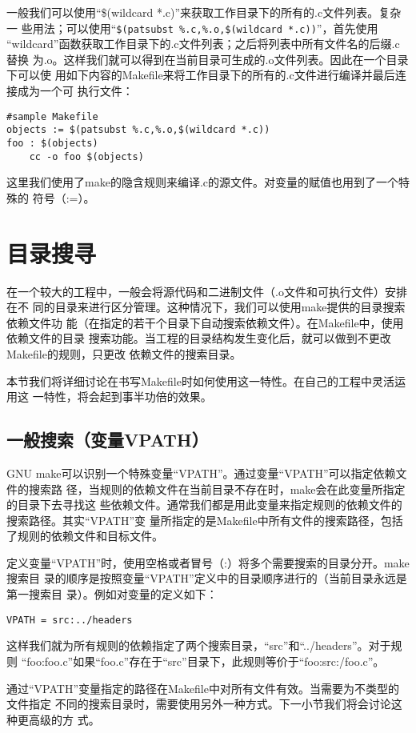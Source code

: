 一般我们可以使用“\$(wildcard *.c)”来获取工作目录下的所有的.c文件列表。复杂一
些用法；可以使用“\verb"$(patsubst %.c,%.o,$(wildcard *.c))"”，首先使用
“wildcard”函数获取工作目录下的.c文件列表；之后将列表中所有文件名的后缀.c替换
为.o。这样我们就可以得到在当前目录可生成的.o文件列表。因此在一个目录下可以使
用如下内容的Makefile来将工作目录下的所有的.c文件进行编译并最后连接成为一个可
执行文件：
\begin{Verbatim}[]
#sample Makefile
objects := $(patsubst %.c,%.o,$(wildcard *.c))
foo : $(objects)
    cc -o foo $(objects)
\end{Verbatim}

这里我们使用了make的隐含规则来编译.c的源文件。对变量的赋值也用到了一个特殊的
符号（:=）。


\section{目录搜寻}
在一个较大的工程中，一般会将源代码和二进制文件（.o文件和可执行文件）安排在不
同的目录来进行区分管理。这种情况下，我们可以使用make提供的目录搜索依赖文件功
能（在指定的若干个目录下自动搜索依赖文件）。在Makefile中，使用依赖文件的目录
搜索功能。当工程的目录结构发生变化后，就可以做到不更改Makefile的规则，只更改
依赖文件的搜索目录。

本节我们将详细讨论在书写Makefile时如何使用这一特性。在自己的工程中灵活运用这
一特性，将会起到事半功倍的效果。

\subsection{一般搜索（变量VPATH）}
GNU make可以识别一个特殊变量“VPATH”。通过变量“VPATH”可以指定依赖文件的搜索路
径，当规则的依赖文件在当前目录不存在时，make会在此变量所指定的目录下去寻找这
些依赖文件。通常我们都是用此变量来指定规则的依赖文件的搜索路径。其实“VPATH”变
量所指定的是Makefile中所有文件的搜索路径，包括了规则的依赖文件和目标文件。

定义变量“VPATH”时，使用空格或者冒号（:）将多个需要搜索的目录分开。make搜索目
录的顺序是按照变量“VPATH”定义中的目录顺序进行的（当前目录永远是第一搜索目
录）。例如对变量的定义如下：
\begin{Verbatim}[]
VPATH = src:../headers
\end{Verbatim}
这样我们就为所有规则的依赖指定了两个搜索目录，“src”和“../headers”。对于规则
“foo:foo.c”如果“foo.c”存在于“src”目录下，此规则等价于“foo:src:/foo.c”。

通过“VPATH”变量指定的路径在Makefile中对所有文件有效。当需要为不类型的文件指定
不同的搜索目录时，需要使用另外一种方式。下一小节我们将会讨论这种更高级的方
式。


